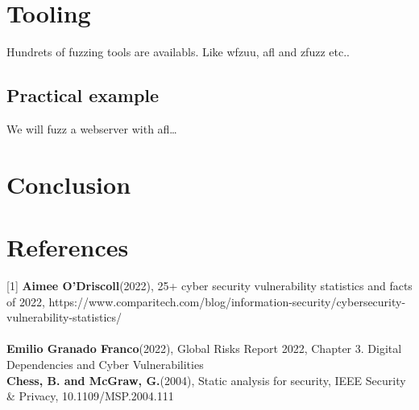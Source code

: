 \documentclass[journal=tosc,final]{iacrtrans}
\begin{document}
\section{Tooling}
Hundrets of fuzzing tools are availabls. Like wfzuu, afl and zfuzz etc..
\subsection{Practical example}
We will fuzz a webserver with afl\dots
\section{Conclusion}




\section{References}
[1] \textbf{Aimee O'Driscoll}(2022), 25+ cyber security vulnerability statistics and facts of 2022, https://www.comparitech.com/blog/information-security/cybersecurity-vulnerability-statistics/\\
\\
\noindent[2] \textbf{Emilio Granado Franco}(2022),  Global Risks Report 2022, Chapter 3. Digital Dependencies and Cyber Vulnerabilities\\

\noindent[3] \textbf{Chess, B. and McGraw, G.}(2004), Static analysis for security, IEEE Security \& Privacy, 10.1109/MSP.2004.111
\end{document}
